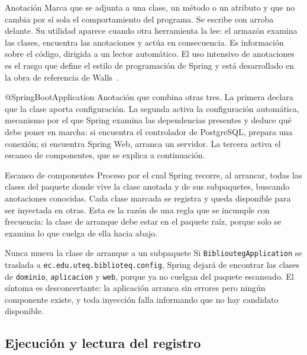 \documentclass[11pt,a4paper,openany]{book}
\begin{document}
\begin{cajadefinicion}{Anotación}
	Marca que se adjunta a una clase, un método o un atributo y que no cambia por sí sola el comportamiento del programa. Se escribe con arroba delante. Su utilidad aparece cuando otra herramienta la lee: el armazón examina las clases, encuentra las anotaciones y actúa en consecuencia. Es información sobre el código, dirigida a un lector automático. El uso intensivo de anotaciones es el rasgo que define el estilo de programación de Spring y está desarrollado en la obra de referencia de Walls~\cite{walls2022spring}.
\end{cajadefinicion}

\begin{cajadefinicion}{@SpringBootApplication}
	Anotación que combina otras tres. La primera declara que la clase aporta configuración. La segunda activa la configuración automática, mecanismo por el que Spring examina las dependencias presentes y deduce qué debe poner en marcha: si encuentra el controlador de PostgreSQL, prepara una conexión; si encuentra Spring Web, arranca un servidor. La tercera activa el escaneo de componentes, que se explica a continuación.
\end{cajadefinicion}

\begin{cajadefinicion}{Escaneo de componentes}
	Proceso por el cual Spring recorre, al arrancar, todas las clases del paquete donde vive la clase anotada y de sus subpaquetes, buscando anotaciones conocidas. Cada clase marcada se registra y queda disponible para ser inyectada en otras. Esta es la razón de una regla que se incumple con frecuencia: la clase de arranque debe estar en el paquete raíz, porque solo se examina lo que cuelga de ella hacia abajo.
\end{cajadefinicion}

\begin{cajaadvertencia}{Nunca mueva la clase de arranque a un subpaquete}
	Si \texttt{BiblioutegApplication} se traslada a \texttt{ec.edu.uteq.biblioteq.config}, Spring dejará de encontrar las clases de \texttt{dominio}, \texttt{aplicacion} y \texttt{web}, porque ya no cuelgan del paquete escaneado. El síntoma es desconcertante: la aplicación arranca sin errores pero ningún componente existe, y toda inyección falla informando que no hay candidato disponible.
\end{cajaadvertencia}

\subsection{Ejecución y lectura del registro}
\label{sec:ejecucion}
\end{document}
